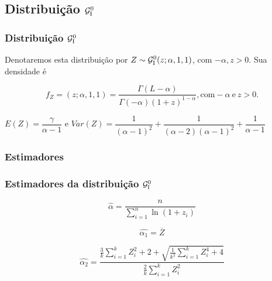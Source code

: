 \subsection{Distribuição $\mathcal{G}_{\rm I}^{0}$}

\begin{frame}
\frametitle{Distribui\c c\~ ao $\mathcal{G}_{\rm I}^{0}$}
\begin{dist}[$\mathcal{G}_{\rm I}^{0}$]
Denotaremos esta distribuição por $Z\sim\mathcal{G}_{\rm I}^{0}(z; \alpha,1,1)$, com $-\alpha, z>0$. Sua densidade é

{\small $$f_{Z}=(z;\alpha,1,1)=\dfrac{\Gamma(L-\alpha)}{\Gamma(-\alpha)(1+z)^{1-\alpha}}, \mbox{com} -\alpha \ \mbox{e}\ z>0.$$ }

\bigskip\bigskip

{\scriptsize $E(Z)=\dfrac{\gamma}{\alpha-1}$\hspace{1cm} e \hspace{1cm}$Var(Z)=\dfrac{1}{(\alpha-1)^2}+\dfrac{1}{(\alpha-2)(\alpha-1)^2}+\dfrac{1}{\alpha-1}$ }
\end{dist}
\end{frame}

\subsubsection{Estimadores}

\begin{frame}
\frametitle{Estimadores da distribuição $\mathcal{G}_{\rm I}^{0}$}
\begin{emv}[$\mathcal{G}_{\rm I}^{0}$]
$$\widehat{\alpha}=\dfrac{n}{\displaystyle\sum_{i=1}^{n}\ln(1+z_i)}$$
\end{emv}

\begin{mo1}[$\mathcal{G}_{\rm I}^{0}$]
$$\widehat{\alpha_{1}}=\overline{Z}$$
\end{mo1}
\end{frame}
\begin{frame}
\begin{mo2}[$\mathcal{G}_{\rm I}^{0}$]
$$\widehat{\alpha_{2}} = \frac{\frac{3}{k}\displaystyle\sum_{i=1}^{k}Z_{i}^{2}+2+\sqrt{\frac{1}{k^{2}}\displaystyle\sum_{i=1}^{k}Z_{i}^{4}+4}}{\frac{2}{k}\displaystyle\sum_{i=1}^{k}Z_{i}^{2}}$$
\end{mo2}
\end{frame}

